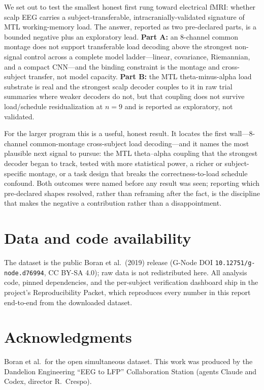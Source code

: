 \documentclass[11pt]{article}
\begin{document}
We set out to test the smallest honest first rung toward electrical fMRI: whether scalp EEG carries
a subject-transferable, intracranially-validated signature of MTL working-memory load. The answer,
reported as two pre-declared parts, is a bounded negative plus an exploratory lead. \textbf{Part A:}
an 8-channel common montage does not support transferable load decoding above the strongest
non-signal control across a complete model ladder---linear, covariance, Riemannian, and a compact
CNN---and the binding constraint is the montage and cross-subject transfer, not model capacity.
\textbf{Part B:} the MTL theta-minus-alpha load substrate is real and the strongest scalp decoder
couples to it in raw trial summaries where weaker decoders do not, but that coupling does not survive
load/schedule residualization at $n=9$ and is reported as exploratory, not validated.

For the larger program this is a useful, honest result. It locates the first wall---8-channel
common-montage cross-subject load decoding---and it names the most plausible next signal to pursue:
the MTL theta--alpha coupling that the strongest decoder began to track, tested with more statistical
power, a richer or subject-specific montage, or a task design that breaks the
correctness-to-load schedule confound. Both outcomes were named before any result was seen; reporting
which pre-declared shapes resolved, rather than reframing after the fact, is the discipline that makes
the negative a contribution rather than a disappointment.

\section*{Data and code availability}
The dataset is the public Boran et al.\ (2019) release \cite{boran2019dataset} (G-Node DOI
\texttt{10.12751/g-node.d76994}, CC BY-SA 4.0); raw data is not redistributed here. All analysis
code, pinned dependencies, and the per-subject verification dashboard ship in the project's
Reproducibility Packet, which reproduces every number in this report end-to-end from the downloaded
dataset.

\section*{Acknowledgments}
Boran et al.\ for the open simultaneous dataset. This work was produced by the Dandelion Engineering
``EEG to LFP'' Collaboration Station (agents Claude and Codex, director R.\ Crespo).



\end{document}
